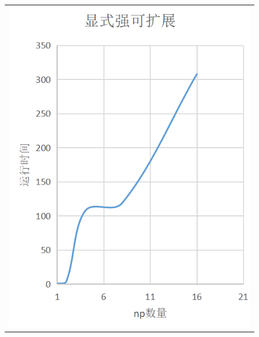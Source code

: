 \documentclass[3p]{elsarticle}
\numberwithin{equation}{section}
\begin{document}
	\begin{figure}[h]
		\begin{center}
			\begin{tabular}{c}
				\includegraphics[angle=0, scale=0.25]{./figures/strong_ex.png}

\end{tabular}
\end{center}
\end{figure}
\end{document}

